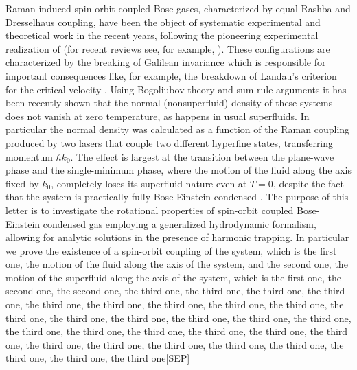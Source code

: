 Raman-induced spin-orbit coupled Bose gases, characterized by equal Rashba and Dresselhaus coupling, have been the object of systematic experimental and theoretical work in the recent years, following the pioneering experimental realization of \cite{Dresselhaus} (for recent reviews see, for example, \cite{Dresselhaus2,Dresselhaus3}). These configurations are characterized by the breaking of Galilean invariance which is responsible for important consequences like, for example, the breakdown of Landau's criterion for the critical velocity \cite{Landau,Landau1,Landau2}. Using Bogoliubov theory and sum rule arguments it has been recently shown \cite{Dresselhaus} that the normal (nonsuperfluid) density of these systems does not vanish at zero temperature, as happens in usual superfluids. In particular the normal density was calculated as a function of the Raman coupling produced by two lasers that couple two different hyperfine states, transferring momentum $\hbar k_0$. The effect is largest at the transition between the plane-wave phase and the single-minimum phase, where the motion of the fluid along the axis fixed by $k_0$, completely loses its superfluid nature even at $T=0$, despite the fact that the system is practically fully Bose-Einstein condensed \cite{Landau}.
The purpose of this letter is to investigate the rotational properties of spin-orbit coupled Bose-Einstein condensed gas employing a generalized hydrodynamic formalism, allowing for analytic solutions in the presence of harmonic trapping. In particular we prove the existence of a spin-orbit coupling of the system, which is the first one, the motion of the fluid along the axis of the system, and the second one, the motion of the superfluid along the axis of the system, which is the first one, the second one, the second one, the third one, the third one, the third one, the third one, the third one, the third one, the third one, the third one, the third one, the third one, the third one, the third one, the third one, the third one, the third one, the third one, the third one, the third one, the third one, the third one, the third one, the third one, the third one, the third one, the third one, the third one, the third one, the third one, the third one[SEP]
\importpackages{}
\graphicspath{ {./images/} }


\maketitle
